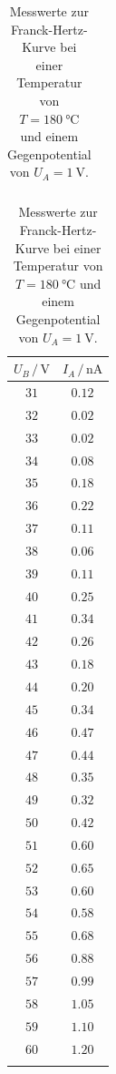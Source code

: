 \begin{table}
\begin{tabular}{cc|}
        \bottomrule
    \end{tabular}
        \begin{tabular}{|cc}
        \toprule
        $U_B \,/\, \si{\volt}$ & $I_A \,/\, \si{\nano\ampere}$ \\
        \midrule
        $31$ & $0.12$ \\
        $32$ & $0.02$ \\
        $33$ & $0.02$ \\
        $34$ & $0.08$ \\
        $35$ & $0.18$ \\
        $36$ & $0.22$ \\
        $37$ & $0.11$ \\
        $38$ & $0.06$ \\
        $39$ & $0.11$ \\
        $40$ & $0.25$ \\
        $41$ & $0.34$ \\
        $42$ & $0.26$ \\
        $43$ & $0.18$ \\
        $44$ & $0.20$ \\
        $45$ & $0.34$ \\
        $46$ & $0.47$ \\
        $47$ & $0.44$ \\
        $48$ & $0.35$ \\
        $49$ & $0.32$ \\
        $50$ & $0.42$ \\
        $51$ & $0.60$ \\
        $52$ & $0.65$ \\
        $53$ & $0.60$ \\
        $54$ & $0.58$ \\
        $55$ & $0.68$ \\
        $56$ & $0.88$ \\
        $57$ & $0.99$ \\
        $58$ & $1.05$ \\
        $59$ & $1.10$ \\
        $60$ & $1.20$ \\
             &        \\
        \bottomrule
    \end{tabular}
    \caption{Messwerte zur Franck-Hertz-Kurve bei einer Temperatur von $T = \SI{180}{\degreeCelsius}$ und einem Gegenpotential von $U_A = \SI{1}{\volt}$. \cite{matplotlib}\cite{scipy}\cite{uncertainties}\cite{numpy}}
    \label{tab:franck_hertz}
\end{table}


